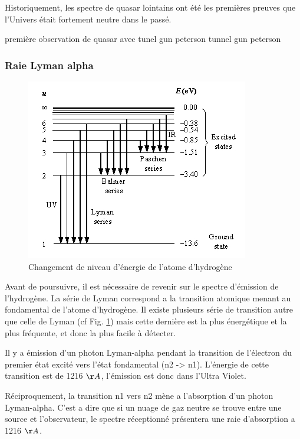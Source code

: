 Historiquement, les spectre de quasar lointains ont été les premières preuves que l'Univers était fortement neutre dans le passé.

première observation de quasar avec tunel gun peterson \cite{1965ApJ...141.1295S}
tunnel gun peterson \cite{1965ApJ...142.1633G} 

\subsubsection{Raie Lyman alpha}

\begin{figure}[htbp]
\centering
        \includegraphics[width=.95\textwidth]{img/01/lyman.jpg} 
        \caption{Changement de niveau d'énergie de l'atome d'hydrogène}
 		\label{fig:lyman}
\end{figure}

Avant de poursuivre, il est nécessaire  de revenir sur le spectre d’émission de l’hydrogène.
La série de Lyman correspond a la transition atomique menant au fondamental de l'atome d'hydrogène.
Il existe plusieurs série de transition autre que celle de Lyman (cf Fig. \ref{fig:lyman}) mais cette dernière est la plus énergétique et la plus fréquente, et donc la plus facile à détecter.

Il y a émission d'un photon Lyman-alpha pendant la transition de l'électron du premier état excité vers l’état fondamental (n2 -> n1).
L'énergie de cette transition est de 1216 $\AA$, l’émission est donc dans l'Ultra Violet.

Réciproquement, la transition n1 vers n2 mène a l'absorption d'un photon Lyman-alpha.
C'est a dire que si un nuage de gaz neutre se trouve entre une source et l'observateur, le spectre réceptionné présentera une raie d'absorption a 1216 $\AA$.

